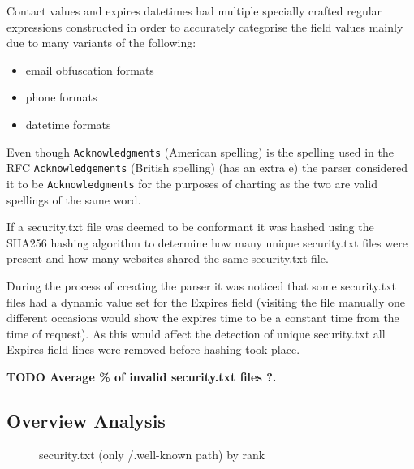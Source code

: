 \documentclass{mscreport}
\begin{document}
\vspace{0.3cm} \noindent
Contact values and expires datetimes had multiple specially crafted regular expressions constructed in order to accurately categorise the field values mainly due to many variants of the following:

\begin{itemize}
	\setlength\itemsep{0.01em}
    \item email obfuscation formats
    \item phone formats
    \item datetime formats
\end{itemize}

\vspace{0.3cm} \noindent
Even though \texttt{Acknowledgments} (American spelling) is the spelling used in the RFC \texttt{Acknowledgements} (British spelling) (has an extra e) the parser considered it to be \texttt{Acknowledgments} for the purposes of charting as the two are valid spellings of the same word.

\vspace{0.3cm} \noindent
If a security.txt file was deemed to be conformant it was hashed using the SHA256 hashing algorithm to determine how many unique security.txt files were present and how many websites shared the same security.txt file.

\vspace{0.3cm} \noindent
During the process of creating the parser it was noticed that some security.txt files had a dynamic value set for the Expires field (visiting the file manually one different occasions would show the expires time to be a constant time from the time of request). As this would affect the detection of unique security.txt all Expires field lines were removed before hashing took place.

\vspace{0.3cm} \noindent
\textbf{TODO Average \% of invalid security.txt files ?.}

\clearpage
\newpage
\subsection{Overview Analysis}

\begin{figure}[H]
	\begin{center}
		\caption{security.txt (only /.well-known path) by rank}
		\label{fig:security_txt_by_rank}
	\end{center}
\end{figure}
\end{document}
